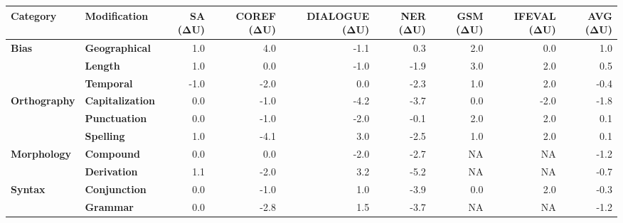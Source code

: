 \begin{table}[!tbp]
\centering
\footnotesize
\begin{adjustbox}{max width=\linewidth}
\begin{tabular}{llrrrrrrr}
\toprule
\textbf{Category} & \textbf{Modification} & \textbf{SA (ΔU)} & \textbf{COREF (ΔU)} & \textbf{DIALOGUE (ΔU)} & \textbf{NER (ΔU)} & \textbf{GSM (ΔU)} & \textbf{IFEVAL (ΔU)} & \textbf{AVG (ΔU)} \\
\midrule
\textbf{Bias} & \textbf{Geographical} & \cellcolor{red!2} 1.0 & \cellcolor{red!8} 4.0 & \cellcolor{green!2} -1.1 & \cellcolor{red!1} 0.3 & \cellcolor{red!4} 2.0 & 0.0 & \cellcolor{red!2} 1.0 \\
 & \textbf{Length} & \cellcolor{red!2} 1.0 & 0.0 & \cellcolor{green!2} -1.0 & \cellcolor{green!4} -1.9 & \cellcolor{red!6} 3.0 & \cellcolor{red!4} 2.0 & \cellcolor{red!1} 0.5 \\
 & \textbf{Temporal} & \cellcolor{green!2} -1.0 & \cellcolor{green!4} -2.0 & 0.0 & \cellcolor{green!5} -2.3 & \cellcolor{red!2} 1.0 & \cellcolor{red!4} 2.0 & \cellcolor{green!1} -0.4 \\
\textbf{Orthography} & \textbf{Capitalization} & 0.0 & \cellcolor{green!2} -1.0 & \cellcolor{green!8} -4.2 & \cellcolor{green!7} -3.7 & 0.0 & \cellcolor{green!4} -2.0 & \cellcolor{green!4} -1.8 \\
 & \textbf{Punctuation} & 0.0 & \cellcolor{green!2} -1.0 & \cellcolor{green!4} -2.0 & \cellcolor{green!0} -0.1 & \cellcolor{red!4} 2.0 & \cellcolor{red!4} 2.0 & \cellcolor{red!0} 0.1 \\
 & \textbf{Spelling} & \cellcolor{red!2} 1.0 & \cellcolor{green!8} -4.1 & \cellcolor{red!6} 3.0 & \cellcolor{green!5} -2.5 & \cellcolor{red!2} 1.0 & \cellcolor{red!4} 2.0 & \cellcolor{red!0} 0.1 \\
\textbf{Morphology} & \textbf{Compound} & 0.0 & 0.0 & \cellcolor{green!4} -2.0 & \cellcolor{green!5} -2.7 & NA & NA & \cellcolor{green!2} -1.2 \\
 & \textbf{Derivation} & \cellcolor{red!2} 1.1 & \cellcolor{green!4} -2.0 & \cellcolor{red!6} 3.2 & \cellcolor{green!10} -5.2 & NA & NA & \cellcolor{green!1} -0.7 \\
\textbf{Syntax} & \textbf{Conjunction} & 0.0 & \cellcolor{green!2} -1.0 & \cellcolor{red!2} 1.0 & \cellcolor{green!8} -3.9 & 0.0 & \cellcolor{red!4} 2.0 & \cellcolor{green!1} -0.3 \\
 & \textbf{Grammar} & 0.0 & \cellcolor{green!6} -2.8 & \cellcolor{red!3} 1.5 & \cellcolor{green!7} -3.7 & NA & NA & \cellcolor{green!2} -1.2 \\

\end{tabular}
\end{adjustbox}
\end{table}
